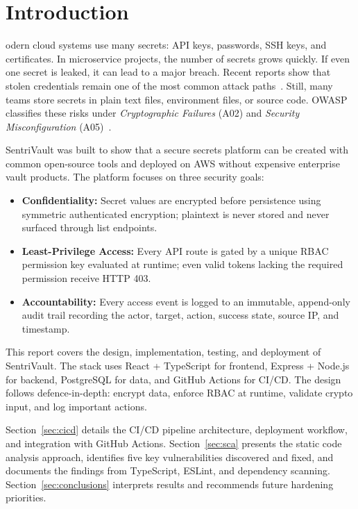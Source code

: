 \documentclass[conference]{IEEEtran}
\begin{document}
\section{Introduction}
\label{sec:intro}

\lettrine[findent=2pt]{}{ }odern cloud systems use many secrets: API keys, passwords, SSH keys, and certificates. In microservice projects, the number of secrets grows quickly. If even one secret is leaked, it can lead to a major breach. Recent reports show that stolen credentials remain one of the most common attack paths~\cite{verizon2023}. Still, many teams store secrets in plain text files, environment files, or source code. OWASP classifies these risks under \textit{Cryptographic Failures} (A02) and \textit{Security Misconfiguration} (A05)~\cite{owasp2021}.

SentriVault was built to show that a secure secrets platform can be created with common open-source tools and deployed on AWS without expensive enterprise vault products. The platform focuses on three security goals:

\begin{itemize}
  \item \textbf{Confidentiality:} Secret values are encrypted before persistence using symmetric authenticated encryption; plaintext is never stored and never surfaced through list endpoints.
  \item \textbf{Least-Privilege Access:} Every API route is gated by a unique RBAC permission key evaluated at runtime; even valid tokens lacking the required permission receive HTTP 403.
  \item \textbf{Accountability:} Every access event is logged to an immutable, append-only audit trail recording the actor, target, action, success state, source IP, and timestamp.
\end{itemize}

This report covers the design, implementation, testing, and deployment of SentriVault. The stack uses React + TypeScript for frontend, Express + Node.js for backend, PostgreSQL for data, and GitHub Actions for CI/CD. The design follows defence-in-depth: encrypt data, enforce RBAC at runtime, validate crypto input, and log important actions.

Section~\ref{sec:cicd} details the CI/CD pipeline architecture, deployment workflow, and integration with GitHub Actions. Section~\ref{sec:sca} presents the static code analysis approach, identifies five key vulnerabilities discovered and fixed, and documents the findings from TypeScript, ESLint, and dependency scanning. Section~\ref{sec:conclusions} interprets results and recommends future hardening priorities.
\end{document}
